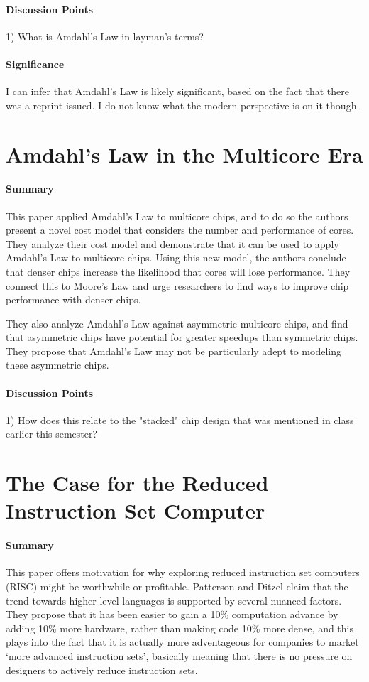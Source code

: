 \paragraph{\textbf{Discussion Points}}
1) What is Amdahl's Law in layman's terms?
\paragraph{\textbf{Significance}}
I can infer that Amdahl's Law is likely significant, based on the fact that
there was a reprint issued. I do not know what the modern perspective is on
it though.


\section {Amdahl’s Law in the Multicore Era \cite{hill2008amdahl}}

\paragraph{\textbf{Summary}}
This paper applied Amdahl's Law to multicore chips, and to do so the authors
present a novel cost model that considers the number and performance of
cores. They analyze their cost model and demonstrate that it can be used to
apply Amdahl's Law to multicore chips. Using this new model, the authors
conclude that denser chips increase the likelihood that cores will lose
performance. They connect this to Moore's Law and urge researchers to find
ways to improve chip performance with denser chips.

They also analyze Amdahl's Law against asymmetric multicore chips, and find
that asymmetric chips have potential for greater speedups than symmetric
chips. They propose that Amdahl's Law may not be particularly adept to
modeling these asymmetric chips.
\paragraph{\textbf{Discussion Points}}
1) How does this relate to the "stacked" chip design that was mentioned in
class earlier this semester?


\section {The Case for the Reduced Instruction Set Computer
\cite{patterson1980case}}

\paragraph{\textbf{Summary}}
This paper offers motivation for why exploring reduced instruction set computers
(RISC) might be worthwhile or profitable. Patterson and Ditzel claim that the
trend towards higher level languages is supported by several nuanced factors.
They propose that it has been easier to gain a 10\% computation advance by
adding 10\% more hardware, rather than making code 10\% more dense, and this
plays into the fact that it is actually more adventageous for companies to
market `more advanced instruction sets', basically meaning that there is no
pressure on designers to actively reduce instruction sets.

